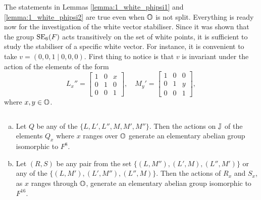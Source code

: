 The statements in Lemmas \ref{lemma:1_white_phipsi1} and \ref{lemma:1_white_phipsi2} are
true even when $\mathbb{O}$ is not split. Everything is ready now for the investigation of the white vector stabiliser. Since it was shown
that the group $\mathrm{SE}_6(F)$ acts transitively on the set of white points, it is sufficient to
study the stabiliser of a specific white vector.  For instance, it is convenient to take
$v = (0,0,1\mid 0,0,0)$. First thing to notice is that $v$ is invariant under the action of the
elements of the form
\begin{equation}
    L_x'' = \begin{bmatrix}
        1&0&x \\
        0&1&0 \\
        0&0&1
    \end{bmatrix},\quad 
    M_y' = \begin{bmatrix}
        1&0&0\\
        0&1&y\\
        0&0&1
    \end{bmatrix},
\end{equation}
where $x,y \in \mathbb{O}$.

\begin{lemma}$ $
	\label{lemma:1_q16}
	\begin{enumerate}[(a)]
		\item Let $Q$ be any of the $\{L,L',L'',M,M',M''\}$. 
		Then the actions on $\mathbb{J}$ of the 
		elements $Q_x$ where $x$ ranges over $\mathbb{O}$ generate an elementary abelian group 
		isomorphic to $F^8$. 
		
		\item Let $(R, S)$ be any pair from the set 
		$\{(L,M''), (L',M), (L'',M')\}$ or any of the 
		$\{(L,M'), (L',M''), (L'',M)\}$. Then
		the actions of $R_x$ and $S_x$, as $x$ ranges through $\mathbb{O}$, 
		generate an elementary abelian 
		group isomorphic to $F^{16}$. 
	\end{enumerate}
\end{lemma}

